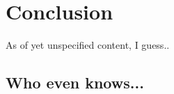 \chapter{Conclusion}
\label{cha:conclusion}

As of yet unspecified content, I guess..

\section{Who even knows...}
\label{sec:whoknows}
